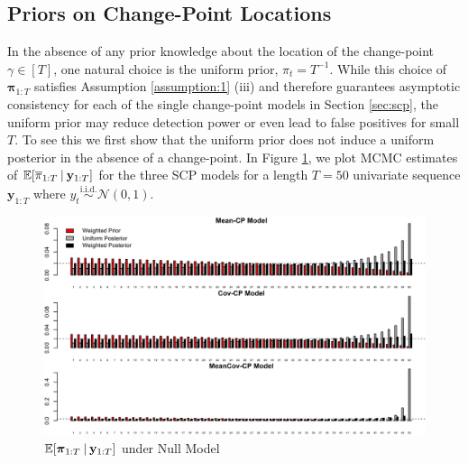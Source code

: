 \subsection{Priors on Change-Point Locations}

\label{app:prior}

In the absence of any prior knowledge about the location of the change-point $\gamma \in [T]$, one natural choice is the uniform prior, $\pi_t = T^{-1}$. While this choice of $\boldsymbol{\pi}_{1:T}$ satisfies Assumption \ref{assumption:1} (iii) and therefore guarantees asymptotic consistency for each of the single change-point models in Section \ref{sec:scp}, the uniform prior may reduce detection power or even lead to false positives for small $T$. To see this we first show that the uniform prior does not induce a uniform posterior in the absence of a change-point. In Figure \ref{fig:post-probs-plot}, we plot MCMC estimates of $\mathbb{E}[\overline{\pi}_{1:T} \:|\: \mathbf{y}_{1:T}]$ for the three SCP models for a length $T=50$ univariate sequence $\mathbf{y}_{1:T}$ where $y_t \overset{\text{i.i.d.}}{\sim}\mathcal{N}(0,1)$. 
\begin{figure}[!h]
    \centering
    \includegraphics[scale = 0.4]{MICH/Figures/posterior_probs.png}
    \caption{$\mathbb{E}[\boldsymbol{\pi}_{1:T}\:|\: \mathbf{y}_{1:T}]$ under Null Model}
    \label{fig:post-probs-plot}
\end{figure}

